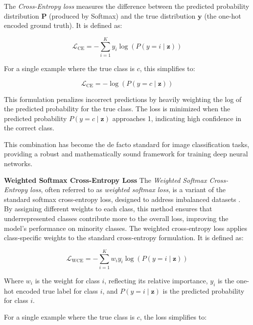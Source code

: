 The \textit{Cross-Entropy loss} measures the difference between the predicted probability distribution \( \mathbf{P} \) (produced by Softmax) and the true distribution \( \mathbf{y} \) (the one-hot encoded ground truth). It is defined as:

\begin{equation}
    \mathcal{L}_{\text{CE}} = -\sum_{i=1}^{K} y_i \log(P(y = i \mid \mathbf{z}))
\end{equation}


For a single example where the true class is \( c \), this simplifies to:

\begin{equation}
    \mathcal{L}_{\text{CE}} = -\log(P(y = c \mid \mathbf{z}))
\end{equation}


This formulation penalizes incorrect predictions by heavily weighting the log of the predicted probability for the true class. The loss is minimized when the predicted probability \( P(y = c \mid \mathbf{z}) \) approaches 1, indicating high confidence in the correct class.

This combination has become the de facto standard for image classification tasks, providing a robust and mathematically sound framework for training deep neural networks.


\myindent \textbf{Weighted Softmax Cross-Entropy Loss}
The \textit{Weighted Softmax Cross-Entropy loss}, often referred to as \textit{weighted softmax loss}, is a variant of the standard softmax cross-entropy loss, designed to address imbalanced datasets \cite{pytorch_crossentropy} \cite{lin2018focallossdenseobject}. By assigning different weights to each class, this method ensures that underrepresented classes contribute more to the overall loss, improving the model's performance on minority classes. The weighted cross-entropy loss applies class-specific weights to the standard cross-entropy formulation. It is defined as:

\begin{equation}
    \mathcal{L}_{\text{WCE}} = -\sum_{i=1}^{K} w_i y_i \log(P(y = i \mid \mathbf{z}))
\end{equation}

Where \( w_i \) is the weight for class \( i \), reflecting its relative importance, \( y_i \) is the one-hot encoded true label for class \( i \), and \( P(y = i \mid \mathbf{z}) \) is the predicted probability for class \( i \).

For a single example where the true class is \( c \), the loss simplifies to:

